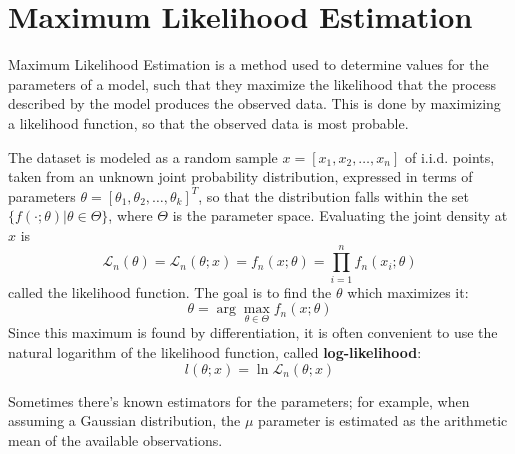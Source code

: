 \chapter{Maximum Likelihood Estimation}

Maximum Likelihood Estimation is a method used to determine values for the parameters of a model, such that they maximize the likelihood that the process described by the model produces the observed data. This is done by maximizing a likelihood function, so that the observed data is most probable.

The dataset is modeled as a random sample $x = [x_1, x_2, \dots, x_n]$ of i.i.d. points, taken from an unknown joint probability distribution, expressed in terms of parameters $\theta = [\theta_1, \theta_2, \dots, \theta_k]^T$, so that the distribution falls within the set $\{f(\cdot; \theta) | \theta \in \Theta \}$, where $\Theta$ is the parameter space. Evaluating the joint density at $x$ is
\begin{equation*}
    \mathcal{L}_n(\theta) = \mathcal{L}_n(\theta; x) = f_n(x;\theta) = \prod_{i=1}^n f_n(x_i;\theta)
\end{equation*}
called the likelihood function. The goal is to find the $\theta$ which maximizes it:
\begin{equation*}
    \theta = \arg \max_{\theta \in \Theta} f_n(x;\theta)
\end{equation*}
Since this maximum is found by differentiation, it is often convenient to use the natural logarithm of the likelihood function, called \textbf{log-likelihood}:
\begin{equation*}
    l(\theta;x) = \ln \mathcal{L}_n (\theta;x)
\end{equation*}

Sometimes there's known estimators for the parameters; for example, when assuming a Gaussian distribution, the $\mu$ parameter is estimated as the arithmetic mean of the available observations.